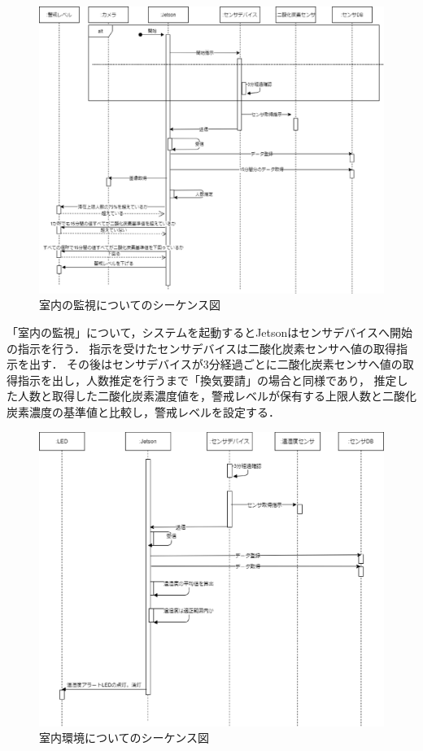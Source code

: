 \begin{figure}
	\centering
	\includegraphics[width=15cm]{uml/sequence_kanshi_3}
	\caption{室内の監視についてのシーケンス図}
	\label{sequencekanshi}
\end{figure}

「室内の監視」について，システムを起動するとJetsonはセンサデバイスへ開始の指示を行う．
指示を受けたセンサデバイスは二酸化炭素センサへ値の取得指示を出す．
その後はセンサデバイスが3分経過ごとに二酸化炭素センサへ値の取得指示を出し，人数推定を行うまで「換気要請」の場合と同様であり，
推定した人数と取得した二酸化炭素濃度値を，警戒レベルが保有する上限人数と二酸化炭素濃度の基準値と比較し，警戒レベルを設定する．

\begin{figure}
	\centering
	\includegraphics[width=15cm]{uml/sequence_shitsunai_2}
	\caption{室内環境についてのシーケンス図}
	\label{sequenceshitsunai}
\end{figure}

